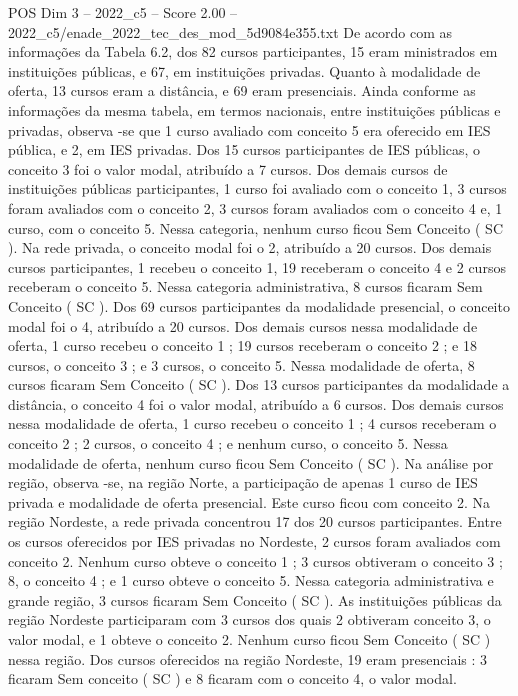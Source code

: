 \begin{textsample}{POS Dim 3 – 2022\_c5 – Score 2.00 – 2022\_c5/enade\_2022\_tec\_des\_mod\_5d9084e355.txt}
De acordo com as informações da Tabela 6.2, dos 82 cursos participantes, 15 eram ministrados em instituições públicas, e 67, em instituições privadas.
Quanto à modalidade de oferta, 13 cursos eram a distância, e 69 eram presenciais.
Ainda conforme as informações da mesma tabela, em termos nacionais, entre instituições públicas e privadas, observa -se que 1 curso avaliado com conceito 5 era oferecido em IES pública, e 2, em IES privadas.
Dos 15 cursos participantes de IES públicas, o conceito 3 foi o valor modal, atribuído a 7 cursos.
Dos demais cursos de instituições públicas participantes, 1 curso foi avaliado com o conceito 1, 3 cursos foram avaliados com o conceito 2, 3 cursos foram avaliados com o conceito 4 e, 1 curso, com o conceito 5.
Nessa categoria, nenhum curso ficou Sem Conceito ( SC ).
Na rede privada, o conceito modal foi o 2, atribuído a 20 cursos.
Dos demais cursos participantes, 1 recebeu o conceito 1, 19 receberam o conceito 4 e 2 cursos receberam o conceito 5.
Nessa categoria administrativa, 8 cursos ficaram Sem Conceito ( SC ).
Dos 69 cursos participantes da modalidade presencial, o conceito modal foi o 4, atribuído a 20 cursos.
Dos demais cursos nessa modalidade de oferta, 1 curso recebeu o conceito 1 ; 19 cursos receberam o conceito 2 ; e 18 cursos, o conceito 3 ; e 3 cursos, o conceito 5.
Nessa modalidade de oferta, 8 cursos ficaram Sem Conceito ( SC ).
Dos 13 cursos participantes da modalidade a distância, o conceito 4 foi o valor modal, atribuído a 6 cursos.
Dos demais cursos nessa modalidade de oferta, 1 curso recebeu o conceito 1 ; 4 cursos receberam o conceito 2 ; 2 cursos, o conceito 4 ; e nenhum curso, o conceito 5.
Nessa modalidade de oferta, nenhum curso ficou Sem Conceito ( SC ).
Na análise por região, observa -se, na região Norte, a participação de apenas 1 curso de IES privada e modalidade de oferta presencial.
Este curso ficou com conceito 2.
Na região Nordeste, a rede privada concentrou 17 dos 20 cursos participantes.
Entre os cursos oferecidos por IES privadas no Nordeste, 2 cursos foram avaliados com conceito 2.
Nenhum curso obteve o conceito 1 ; 3 cursos obtiveram o conceito 3 ; 8, o conceito 4 ; e 1 curso obteve o conceito 5.
Nessa categoria administrativa e grande região, 3 cursos ficaram Sem Conceito ( SC ).
As instituições públicas da região Nordeste participaram com 3 cursos dos quais 2 obtiveram conceito 3, o valor modal, e 1 obteve o conceito 2.
Nenhum curso ficou Sem Conceito ( SC ) nessa região.
Dos cursos oferecidos na região Nordeste, 19 eram presenciais : 3 ficaram Sem conceito ( SC ) e 8 ficaram com o conceito 4, o valor modal.

\end{textsample}
